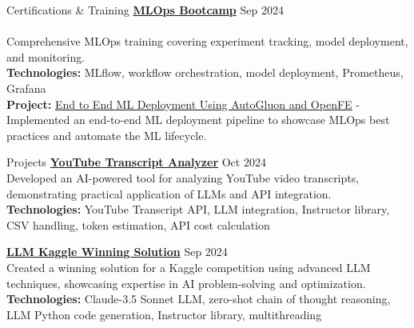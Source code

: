 \documentclass{resume}
\begin{document}
\begin{rSection}{Certifications \& Training}
            \vspace{0.1em}
                    {\href{https://certificate.datatalks.club/mlops-zoomcamp/2024/55db812d19a5b355790d127cb88ca72afdc49df5.pdf}{\textbf{MLOps Bootcamp}}} \hfill {Sep 2024}
        \\ %
        {}
        \\ %
        Comprehensive MLOps training covering experiment tracking, model deployment, and monitoring. %
        \\
        \textbf{Technologies:} MLflow, workflow orchestration, model deployment, Prometheus, Grafana
        \\
                    \textbf{Project:} \href{https://github.com/ArturGR3/MLOps-project}{End to End ML Deployment Using AutoGluon and OpenFE} - 
            Implemented an end-to-end ML deployment pipeline to showcase MLOps best practices and automate the ML lifecycle.
                
            \end{rSection}

\begin{rSection}{Projects}
            {\href{https://github.com/ArturGR3/Youtube-transcript-Q-A}{\textbf{YouTube Transcript Analyzer}}} \hfill {Oct 2024}
        \\
        Developed an AI-powered tool for analyzing YouTube video transcripts, demonstrating practical application of LLMs and API integration.
        \\
        \textbf{Technologies:} YouTube Transcript API, LLM integration, Instructor library, CSV handling, token estimation, API cost calculation
        
            \vspace{0.1em}
                    {\href{https://github.com/ArturGR3/LLM-kaggle-competition}{\textbf{LLM Kaggle Winning Solution}}} \hfill {Sep 2024}
        \\
        Created a winning solution for a Kaggle competition using advanced LLM techniques, showcasing expertise in AI problem-solving and optimization.
        \\
        \textbf{Technologies:} Claude-3.5 Sonnet LLM, zero-shot chain of thought reasoning, LLM Python code generation, Instructor library, multithreading
        
            \end{rSection}
\end{document}
